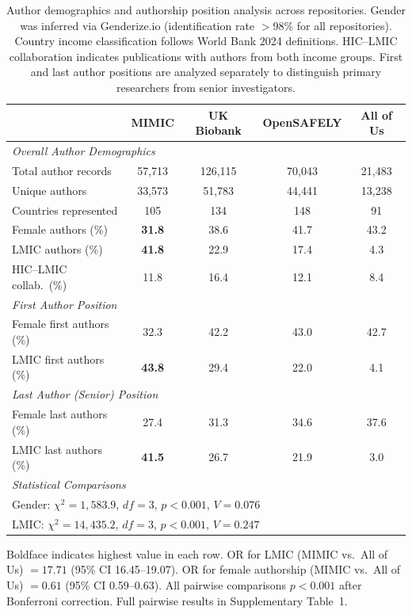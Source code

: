 \begin{table}[H]
\centering
\caption{Author demographics and authorship position analysis across repositories. Gender was inferred via Genderize.io (identification rate $>$98\% for all repositories). Country income classification follows World Bank 2024 definitions. HIC--LMIC collaboration indicates publications with authors from both income groups. First and last author positions are analyzed separately to distinguish primary researchers from senior investigators.}
\label{tab:demographics}
\small
\begin{tabular}{@{}lcccc@{}}
\toprule
& \textbf{MIMIC} & \textbf{UK Biobank} & \textbf{OpenSAFELY} & \textbf{All of Us} \\
\midrule
\multicolumn{5}{l}{\textit{Overall Author Demographics}} \\[3pt]
Total author records & 57,713 & 126,115 & 70,043 & 21,483 \\
Unique authors & 33,573 & 51,783 & 44,441 & 13,238 \\
Countries represented & 105 & 134 & 148 & 91 \\
Female authors (\%) & \textbf{31.8} & 38.6 & 41.7 & 43.2 \\
LMIC authors (\%) & \textbf{41.8} & 22.9 & 17.4 & 4.3 \\
HIC--LMIC collab.\ (\%) & 11.8 & 16.4 & 12.1 & 8.4 \\
\midrule
\multicolumn{5}{l}{\textit{First Author Position}} \\[3pt]
Female first authors (\%) & 32.3 & 42.2 & 43.0 & 42.7 \\
LMIC first authors (\%) & \textbf{43.8} & 29.4 & 22.0 & 4.1 \\
\midrule
\multicolumn{5}{l}{\textit{Last Author (Senior) Position}} \\[3pt]
Female last authors (\%) & 27.4 & 31.3 & 34.6 & 37.6 \\
LMIC last authors (\%) & \textbf{41.5} & 26.7 & 21.9 & 3.0 \\
\midrule
\multicolumn{5}{l}{\textit{Statistical Comparisons}} \\[3pt]
\multicolumn{5}{l}{Gender: $\chi^2 = 1{,}583.9$, $df = 3$, $p < 0.001$, $V = 0.076$} \\
\multicolumn{5}{l}{LMIC: $\chi^2 = 14{,}435.2$, $df = 3$, $p < 0.001$, $V = 0.247$} \\
\bottomrule
\end{tabular}

\vspace{4pt}
{\footnotesize Boldface indicates highest value in each row. OR for LMIC (MIMIC vs.\ All of Us) $= 17.71$ (95\% CI 16.45--19.07). OR for female authorship (MIMIC vs.\ All of Us) $= 0.61$ (95\% CI 0.59--0.63). All pairwise comparisons $p < 0.001$ after Bonferroni correction. Full pairwise results in Supplementary Table~1.}
\end{table}
